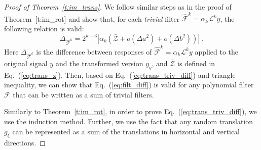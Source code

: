 \documentclass[10pt,journal,compsoc]{IEEEtran}
\newcommand{\mF}{\mathcal{F}}
\newcommand{\hmF}{\hat{\mathcal{F}}}
\newcommand{\norm}[1]{\left|#1\right|}
\begin{document}
	\begin{proof}[Proof of Theorem~\ref{t:im_trans}]
		We follow similar steps as in the proof of Theorem~\ref{t:im_rot} and show that, for each \emph{trivial} filter $\hmF^k = \alpha_k \mathcal{L}^k y$, the following relation is valid:
		\begin{equation}
		\Delta_{\hmF^k} = 2^{k-3} \norm{\alpha_k (\bar{\mathcal{Z}} + o(\Delta a^2) + o(\Delta b^2))} \;.
		\label{eq:trans_triv_diff}
		\end{equation}
		\noindent
		Here $\Delta_{\hmF^k}$ is the difference between responses of $\hmF^k = \alpha_k \mathcal{L}^k y$ applied to the original signal $y$ and the transformed version $y_g$, and $\bar{\mathcal{Z}}$ is defined in Eq.~(\ref{eq:trans_z}). Then, based on Eq.~(\ref{eq:trans_triv_diff}) and triangle inequality, we can show that Eq.~(\ref{eq:filt_diff}) is valid for any polynomial filter $\mF$  that can be written as a sum of trivial filters.
		
		Similarly to Theorem~\ref{t:im_rot}, in order to prove Eq.~(\ref{eq:trans_triv_diff}), we use the induction method. Further, we use the fact that any random translation $g_\xi$ can be represented as a sum of the translations in horizontal and vertical directions.%
		

\end{proof}
\end{document}
